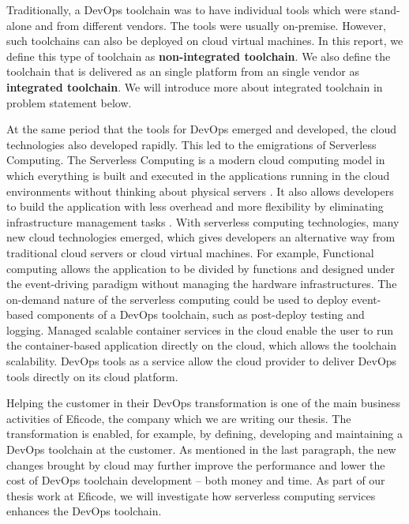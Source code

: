 \par
Traditionally, a DevOps toolchain was to have individual tools which were stand-alone and from different vendors. The tools were usually on-premise. However, such toolchains can also be deployed on cloud virtual machines. In this report, we define this type of toolchain as \textbf{non-integrated toolchain}.
We also define the toolchain that is delivered as an single platform from an single vendor as \textbf{integrated toolchain}. We will introduce more about integrated toolchain in problem statement below.
\par
At the same period that the tools for DevOps emerged and developed, the cloud technologies also developed rapidly. This led to the emigrations of Serverless Computing. 
The Serverless Computing is a modern cloud computing model in which everything is built and executed in the applications running in the cloud environments without thinking about physical servers \cite{Serverle81:online}. It also allows developers to build the application with less overhead \cite{Serverle81:online} and more flexibility by eliminating infrastructure management tasks \cite{Serverle73:online}.
With serverless computing technologies, many new cloud technologies emerged, which gives developers an alternative way from traditional cloud servers or cloud virtual machines. For example, Functional computing allows the application to be divided by functions and designed under the event-driving paradigm without managing the hardware infrastructures. The on-demand nature of the serverless computing could be used to deploy event-based components of a DevOps toolchain, such as post-deploy testing and logging.
Managed scalable container services in the cloud enable the user to run the container-based application directly on the cloud, which allows the toolchain scalability. DevOps tools as a service \cite{DevOpsas45:online} allow the cloud provider to deliver DevOps tools directly on its cloud platform.
\par
Helping the customer in their DevOps transformation is one of the main business activities of Eficode, the company which we are writing our thesis. The transformation is enabled, for example, by defining, developing and maintaining a DevOps toolchain at the customer. As mentioned in the last paragraph, the new changes brought by cloud may further improve the performance and lower the cost of DevOps toolchain development -- both money and time. As part of our thesis work at Eficode, we will investigate how serverless computing services enhances the DevOps toolchain.
